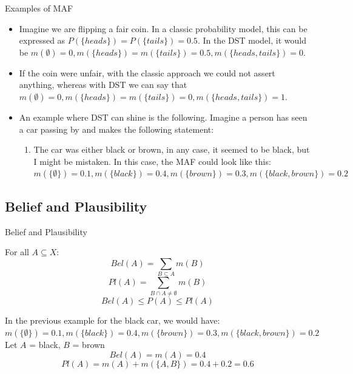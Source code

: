 \documentclass[aspectratio=169]{beamer}
\begin{document}
\begin{frame}{Examples of MAF}
\begin{itemize}
    \item Imagine we are flipping a fair coin. In a classic probability model, this can be expressed as $P(\{heads\}) = P(\{tails\}) = 0.5$. In the DST model, it would be $m(\emptyset) = 0, m(\{heads\}) = m(\{tails\}) = 0.5, m(\{heads, tails\}) = 0$.
    \pause
    \item If the coin were unfair, with the classic approach we could not assert anything, whereas with DST we can say that $m(\emptyset) = 0, m(\{heads\}) = m(\{tails\}) = 0, m(\{heads, tails\}) = 1$.
    \pause
    \item An example where DST can shine is the following. Imagine a person has seen a car passing by and makes the following statement:
    \begin{enumerate}
        \item The car was either black or brown, in any case, it seemed to be black, but I might be mistaken.
        In this case, the MAF could look like this: $m(\{\emptyset\}) = 0.1, m(\{ black\}) = 0.4, m(\{ brown\}) = 0.3, m(\{ black, brown\}) = 0.2$
    \end{enumerate}
\end{itemize}
\end{frame}

\subsection{Belief and Plausibility}
\begin{frame}{Belief and Plausibility}
    \begin{block}{}
         For all \( A \subseteq X \):
          \[
          Bel(A) = \sum_{B \subseteq A} m(B)
          \]
        \[
          Pl(A) = \sum_{B \cap A \neq \emptyset} m(B)
          \]
            \[
            Bel(A) \le P(A) \le Pl(A)
            \]

    In the previous example for the black car, we would have:
    $m(\{\emptyset\}) = 0.1, m(\{ black\}) = 0.4, m(\{ brown\}) = 0.3, m(\{ black, brown\}) = 0.2$ \\
    Let $A$ = black, $B$ = brown
          \[
        Bel(A) = m(A) = 0.4 \]
        \[
        Pl(A) = m(A) + m(\{A, B\}) = 0.4 + 0.2 = 0.6
          \]
    \end{block}
\end{frame}
\end{document}
